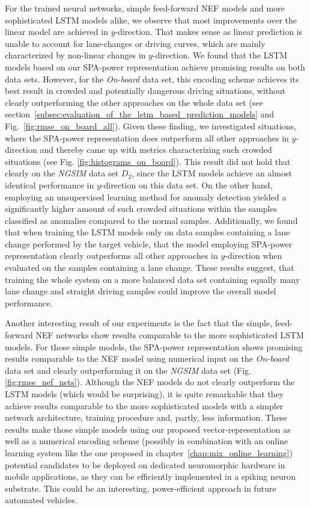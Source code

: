 For the trained neural networks, simple feed-forward \ac{NEF} models and more sophisticated \ac{LSTM} models alike, we observe that most improvements over the linear model are achieved in $y$-direction.
That makes sense as linear prediction is unable to account for lane-changes or driving curves, which are mainly characterized by non-linear changes in $y$-direction.
We found that the \ac{LSTM} models based on our \ac{SPA}-power representation achieve promising results on both data sets.
However, for the \emph{On-board} data set, this encoding scheme achieves its best result in crowded and potentially dangerous driving situations, without clearly outperforming the other approaches on the whole data set (see section~\ref{subsec:evaluation_of_the_lstm_based_prediction_models} and Fig.~\ref{fig:rmse_on_board_all}).
Given these finding, we investigated situations, where the \ac{SPA}-power representation does outperform all other approaches in $y$-direction and thereby came up with metrics characterizing such crowded situations (see Fig. \ref{fig:histograms_on_board}).
This result did not hold that clearly on the \emph{\ac{NGSIM}} data set $D_2$, since the \ac{LSTM} models achieve an almost identical performance in $y$-direction on this data set.
On the other hand, employing an unsupervised learning method for anomaly detection yielded a significantly higher amount of such crowded situations within the samples classified as anomalies compared to the normal samples.
Additionally, we found that when training the \ac{LSTM} models only on data samples containing a lane change performed by the target vehicle, that the model employing \ac{SPA}-power representation clearly outperforms all other approaches in $y$-direction when evaluated on the samples containing a lane change.
These results suggest, that training the whole system on a more balanced data set containing equally many lane change and straight driving samples could improve the overall model performance.

Another interesting result of our experiments is the fact that the simple, feed-forward \ac{NEF} networks show results comparable to the more sophisticated \ac{LSTM} models.
For those simple models, the \ac{SPA}-power representation shows promising results comparable to the \ac{NEF} model using numerical input on the \emph{On-board} data set and clearly outperforming it on the \emph{\ac{NGSIM}} data set (Fig. \ref{fig:rmse_nef_nets}).
Although the \ac{NEF} models do not clearly outperform the \ac{LSTM} models (which would be surprising), it is quite remarkable that they achieve results comparable to the more sophisticated models with a simpler network architecture, training procedure and, partly, less information.
These results make those simple models using our proposed vector-representation as well as a numerical encoding scheme (possibly in combination with an online learning system like the one proposed in chapter~\ref{chap:mix_online_learning}) potential candidates to be deployed on dedicated neuromorphic hardware in mobile applications, as they can be efficiently implemented in a spiking neuron substrate.
This could be an interesting, power-efficient approach in future automated vehicles.

